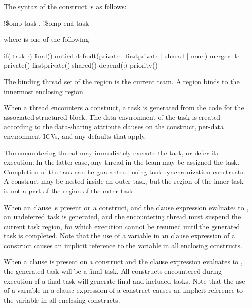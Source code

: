\fortranspecificstart
The syntax of the  construct is as follows: 

\begin{boxedcode}
!\$omp task \plc{[clause[ [},\plc{] clause] ... ]}
!\$omp end task
\end{boxedcode}

where  is one of the following:

\begin{indentedcodelist}
if(\plc{[} task :\plc{] scalar-logical-expression})
final()
untied
default(private \textnormal{|} firstprivate \textnormal{|} shared \textnormal{|} none)
mergeable
private()
firstprivate()
shared()
depend(:)
priority()
\end{indentedcodelist}
\fortranspecificend

\binding
The binding thread set of the  region is the current team. A  region binds to 
the innermost enclosing  region. 

\descr
When a thread encounters a  construct, a task is generated from the code for the 
associated structured block. The data environment of the task is created according to the 
data-sharing attribute clauses on the  construct, per-data environment ICVs, and 
any defaults that apply.

The encountering thread may immediately execute the task, or defer its execution. In the 
latter case, any thread in the team may be assigned the task. Completion of the task can 
be guaranteed using task synchronization constructs. A  construct may be nested 
inside an outer task, but the  region of the inner task is not a part of the  
region of the outer task.

When an  clause is present on a  construct, and the  clause expression 
evaluates to , an undeferred task is generated, and the encountering thread must 
suspend the current task region, for which execution cannot be resumed until the 
generated task is completed. Note that the use of a variable in an  clause expression 
of a  construct causes an implicit reference to the variable in all enclosing 
constructs.

When a  clause is present on a  construct and the  clause expression 
evaluates to , the generated task will be a final task. All  constructs 
encountered during execution of a final task will generate final and included tasks. Note 
that the use of a variable in a  clause expression of a  construct causes an 
implicit reference to the variable in all enclosing constructs.

